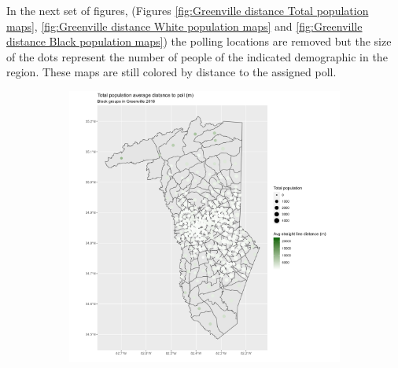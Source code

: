 \documentclass[11pt]{article}
\theoremstyle{remark}
\theoremstyle{definition}
\begin{document}
In the next set of figures, (Figures \ref{fig:Greenville distance Total population maps}, \ref{fig:Greenville  distance White population maps} and \ref{fig:Greenville distance Black population maps}) the polling locations are removed but the size of the dots represent the number of people of the indicated demographic in the region. These maps are still colored by distance to the assigned poll.

\begin{figure}
	\begin{subfigure}{.5\textwidth}
		\centering
		\includegraphics[width=\linewidth]{result_analysis/Greenville_SC_original_configs/population_pop_and_dist_Greenville_config_original_2018_polls.png}
		\label{sfig:York_2018_bg_dist_pop}
	\end{subfigure} 
	\begin{subfigure}{.5\textwidth}
		\centering

\end{subfigure}
\end{figure}
\end{document}
